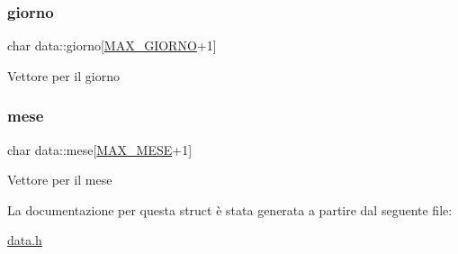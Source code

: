 \subsubsection{\texorpdfstring{giorno}{giorno}}
{\footnotesize\ttfamily char data\+::giorno\mbox{[}\hyperlink{define_8h_a621e6dff6cb0b798f6ca47b15f7d7fcb}{M\+A\+X\+\_\+\+G\+I\+O\+R\+NO}+1\mbox{]}}

Vettore per il giorno \mbox{\label{structdata_acf4492d0a20c3a79802f2b56b8f3a1e7}} 
\subsubsection{\texorpdfstring{mese}{mese}}
{\footnotesize\ttfamily char data\+::mese\mbox{[}\hyperlink{define_8h_a32df43954eb6eea4b4e07751068f97f7}{M\+A\+X\+\_\+\+M\+E\+SE}+1\mbox{]}}

Vettore per il mese 

La documentazione per questa struct è stata generata a partire dal seguente file\+:\begin{DoxyCompactItemize}
\item 
\hyperlink{data_8h}{data.\+h}\end{DoxyCompactItemize}
